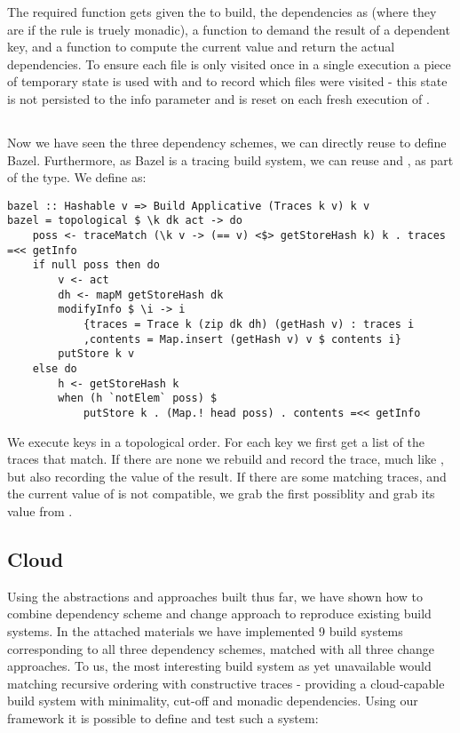 The required  function gets given the  to build, the dependencies as  (where they are  if the rule is truely monadic), a function to demand the result of a dependent key, and a function to compute the current value and return the actual dependencies. To ensure each file is only visited once in a single execution a piece of temporary state is used with  and  to record which files were visited - this state is not persisted to the  info parameter and is reset on each fresh execution of .

\subsection{\Bazel}\label{sec-implementation-bazel}

Now we have seen the three dependency schemes, we can directly reuse  to define Bazel. Furthermore, as Bazel is a tracing build system, we can reuse  and , as part of the  type. We define \Bazel as:

\begin{verbatim}
bazel :: Hashable v => Build Applicative (Traces k v) k v
bazel = topological $ \k dk act -> do
    poss <- traceMatch (\k v -> (== v) <$> getStoreHash k) k . traces =<< getInfo
    if null poss then do
        v <- act
        dh <- mapM getStoreHash dk
        modifyInfo $ \i -> i
            {traces = Trace k (zip dk dh) (getHash v) : traces i
            ,contents = Map.insert (getHash v) v $ contents i}
        putStore k v
    else do
        h <- getStoreHash k
        when (h `notElem` poss) $
            putStore k . (Map.! head poss) . contents =<< getInfo
\end{verbatim}

We execute keys in a topological order. For each key we first get a list of the traces that match. If there are none we rebuild and record the trace, much like \Shake, but also recording the value of the result. If there are some matching traces, and the current value of  is not compatible, we grab the first possiblity and grab its value from .

\subsection{Cloud \Shake}\label{sec-implementation-cloud-shake}

Using the abstractions and approaches built thus far, we have shown how to combine dependency scheme and change approach to reproduce existing build systems. In the attached materials we have implemented 9 build systems corresponding to all three dependency schemes, matched with all three change approaches. To us, the most interesting build system as yet unavailable would matching recursive ordering with constructive traces - providing a cloud-capable build system with minimality, cut-off and monadic dependencies. Using our framework it is possible to define and test such a system:

